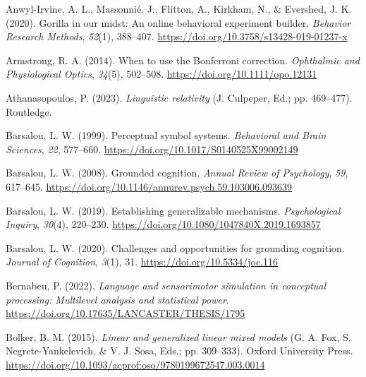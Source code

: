 \documentclass[
  man,floatsintext]{apa7}
\newlength{\cslhangindent}
\newlength{\cslentryspacingunit} %
\newenvironment{CSLReferences}[2] %
 {%
  \setlength{\parindent}{0pt}
  \ifodd #1
  \let\oldpar\par
  \def\par{\hangindent=\cslhangindent\oldpar}
  \fi
  \setlength{\parskip}{#2\cslentryspacingunit}
 }%
 {}
\begin{document}
\hypertarget{refs}{}
\begin{CSLReferences}{1}{0}
\leavevmode{}%
Anwyl-Irvine, A. L., Massonnié, J., Flitton, A., Kirkham, N., \& Evershed, J. K. (2020). Gorilla in our midst: {An} online behavioral experiment builder. \emph{Behavior Research Methods}, \emph{52}(1), 388--407. \url{https://doi.org/10.3758/s13428-019-01237-x}

\leavevmode{}%
Armstrong, R. A. (2014). When to use the {Bonferroni} correction. \emph{Ophthalmic and Physiological Optics}, \emph{34}(5), 502--508. \url{https://doi.org/10.1111/opo.12131}

\leavevmode{}%
Athanasopoulos, P. (2023). \emph{Linguistic relativity} (J. Culpeper, Ed.; pp. 469--477). Routledge.

\leavevmode{}%
Barsalou, L. W. (1999). Perceptual symbol systems. \emph{Behavioral and Brain Sciences}, \emph{22}, 577--660. \url{https://doi.org/10.1017/S0140525X99002149}

\leavevmode{}%
Barsalou, L. W. (2008). Grounded cognition. \emph{Annual Review of Psychology}, \emph{59}, 617--645. \url{https://doi.org/10.1146/annurev.psych.59.103006.093639}

\leavevmode{}%
Barsalou, L. W. (2019). Establishing generalizable mechanisms. \emph{Psychological Inquiry}, \emph{30}(4), 220--230. \url{https://doi.org/10.1080/1047840X.2019.1693857}

\leavevmode{}%
Barsalou, L. W. (2020). Challenges and opportunities for grounding cognition. \emph{Journal of Cognition}, \emph{3}(1), 31. \url{https://doi.org/10.5334/joc.116}

\leavevmode{}%
Bernabeu, P. (2022). \emph{Language and sensorimotor simulation in conceptual processing: Multilevel analysis and statistical power}. \url{https://doi.org/10.17635/LANCASTER/THESIS/1795}

\leavevmode{}%
Bolker, B. M. (2015). \emph{Linear and generalized linear mixed models} (G. A. Fox, S. Negrete-Yankelevich, \& V. J. Sosa, Eds.; pp. 309--333). Oxford University Press. \url{https://doi.org/10.1093/acprof:oso/9780199672547.003.0014}


\end{CSLReferences}
\end{document}
